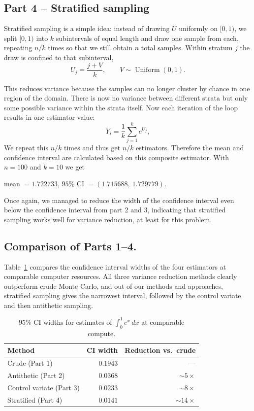 \subsection*{Part 4 -- Stratified sampling}
Stratified sampling is a simple idea: instead of drawing $U$ uniformly on $[0,1)$, we split $[0,1)$ into $k$ subintervals of equal length and draw one sample from each, repeating $n/k$ times so that we still obtain $n$ total samples. 
Within stratum $j$ the draw is confined to that subinterval,
\[
U_j = \frac{j+V}{k}, \qquad V \sim \operatorname{Uniform}(0,1).
\]

This reduces variance because the samples can no longer cluster by chance in one region of the domain. There is now no variance between different strata but only some possible variance within the strata itself.
Now each iteration of the loop results in one estimator value:
\[
Y_i = \frac{1}{k}\sum_{j=1}^{k} e^{U_j},
\]
We repeat this $n/k$ times and thus get $n/k$ estimators. Therefore the mean and confidence interval are calculated based on this composite estimator. 
With $n=100$ and $k=10$ we get
\begin{center}
mean $= 1.722733$, \quad $95\%$ CI $= (1.715688,\ 1.729779)$.
\end{center}

Once again, we managed to reduce the width of the confidence interval even below the confidence interval from part 2 and 3, indicating that stratified sampling works well for variance reduction, at least for this problem.

\subsection*{Comparison of Parts 1--4.}
Table~\ref{tab:vr14} compares the confidence interval widths of the four estimators at comparable computer resources. All three variance reduction methods clearly outperform crude Monte Carlo, and out of our methods and approaches, stratified sampling gives the narrowest interval, followed by the control variate and then antithetic sampling.

\begin{table}[h]
\centering
\caption{$95\%$ CI widths for estimates of $\int_0^1 e^x\,dx$ at comparable compute.}
\label{tab:vr14}
\begin{tabular}{lrr}
\toprule
Method & CI width & Reduction vs.\ crude \\
\midrule
Crude (Part 1)        & $0.1943$ & --- \\
Antithetic (Part 2)   & $0.0368$ & $\sim 5\times$ \\
Control variate (Part 3) & $0.0233$ & $\sim 8\times$ \\
Stratified (Part 4)   & $0.0141$ & $\sim 14\times$ \\
\bottomrule
\end{tabular}
\end{table}

